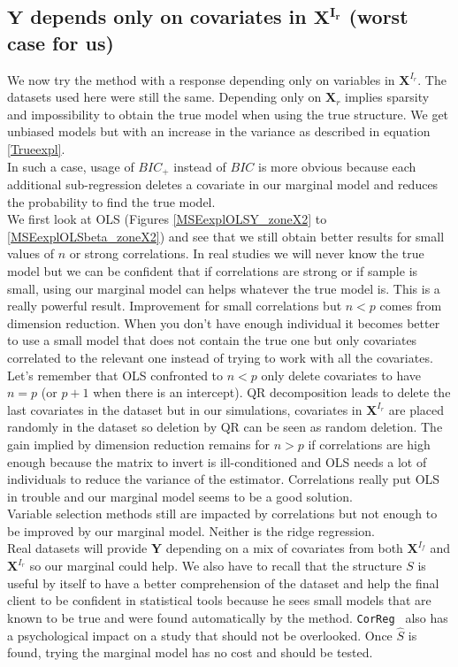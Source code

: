 \documentclass[12pt,a4paper]{report}
\begin{document}
\clearpage
	
	\subsection{$\boldsymbol{Y}$ depends only on covariates in $\boldsymbol{X^{I_r}}$ (worst case for us)}	 \label{tableMSEsimgauche}
We now try the method with a response depending only on variables in $\boldsymbol{X}^{I_r}$. The datasets used here were still the same.
Depending only on $\boldsymbol{X}_r$ implies sparsity and impossibility to obtain the true model when using the true structure.  We get unbiased models but with an increase in the variance as described in equation \ref{Trueexpl}. \\
	In such a case, usage of $BIC_+$ instead of $BIC$ is more obvious because each additional sub-regression deletes a covariate in our marginal model and reduces the probability to find the true model. \\
	
	We first look at OLS (Figures \ref{MSEexplOLSY_zoneX2} to \ref{MSEexplOLSbeta_zoneX2}) and see that we still obtain better results for small values of $n$ or strong correlations. In real studies we will never know the true model but we can be confident that if correlations are strong or if sample is small, using our marginal model can helps whatever the true model is. This is a really powerful result. Improvement for small correlations but $n<p$ comes from dimension reduction. When you don't have enough individual it becomes better to use a small model that does not contain the true one but only covariates correlated to the relevant one instead of trying to work with all the covariates. Let's remember that OLS confronted to $n<p$ only delete covariates to have $n=p$ (or $p+1$ when there is an intercept). QR decomposition leads to delete the last  covariates in the dataset but in our simulations, covariates in $\boldsymbol{X}^{I_r}$ are placed randomly in the dataset so deletion by QR can be seen as random deletion. The gain implied by dimension reduction remains for $n>p$ if correlations are high enough because the matrix to invert is ill-conditioned and OLS needs a lot of individuals to reduce the variance of the estimator. Correlations really put OLS in trouble and our marginal model seems to be a good solution. \\
	
	Variable selection methods still are impacted by correlations but not enough to be improved by our marginal model. Neither is the ridge regression.\\
	 Real datasets will provide $\boldsymbol{Y}$ depending on a mix of covariates from both $\boldsymbol{X}^{I_f}$ and $\boldsymbol{X}^{I_r}$ so our marginal could help. We also have to recall that the structure $S$ is useful by itself to have a better comprehension of the dataset and help the final client to be confident in statistical tools because he sees small models that are known to be true and were found automatically by the method. {\tt CorReg } also has a psychological impact on a study that should not be overlooked. Once $\hat{S}$ is found, trying the marginal model has no cost and should be tested.
\end{document}

